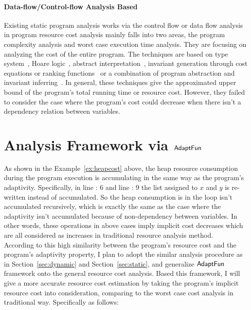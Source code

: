 \paragraph*{Data-flow/Control-flow Analysis Based}
Existing static program analysis works via the control flow or data flow analysis 
in program resource cost analysis 
mainly falls into two areas, the program complexity analysis and worst case execution time analysis. 
They are focusing on analyzing the cost of the entire program. 
The techniques are based on
type system~\cite{CicekBG0H17, RajaniG0021}, Hoare logic~\cite{CarbonneauxHS15}, abstract interpretation~\cite{GustafssonEL05, HumenbergerJK18},
invariant generation through cost equations or ranking functions~\cite{BrockschmidtEFFG16,AlbertAGP08,AliasDFG10,Flores-MontoyaH14}
or a combination of program abstraction and invariant inferring~\cite{GulwaniZ10, SinnZV17,GulwaniJK09}.
In general, these techniques give the approximated upper bound of the program's total running time or resource cost.
However, they failed to consider the case where the program's cost could decrease when there isn't a dependency relation between variables.

\section{Analysis Framework via $\textsf{AdaptFun}$}
\label{sec:generalcost-methodology}
As shown in the Example~\ref{ex:heapcost} above, the heap resource consumption during the program 
execution is accumulating in the same way as the program's adaptivity. 
Specifically, in line : 6 and line :  9
the list assigned to $x$ and $y$ is re-written instead of accumulated.
So the heap consumption is in the loop isn't accumulated recursively, which is exactly
the same as the case where the adaptivity isn't accumulated because of non-dependency between variables.
In other words, these operations in above cases imply implicit cost decreases 
which are all considered as increases in traditional resource analysis 
method.
\\
According to this high similarity between the program's resource cost and the 
program's adaptivity property, I plan to adopt the similar analysis procedure as in Section~\ref{sec:dynamic} and 
Section~\ref{sec:static},
and generalize 
$\textsf{AdaptFun}$ framework onto the general resource cost analysis. 
Based this framework,
I will give
a more accurate resource cost estimation by taking the program's implicit resource cost into consideration, comparing 
to the worst case cost analysis in traditional way. Specifically as follows:
